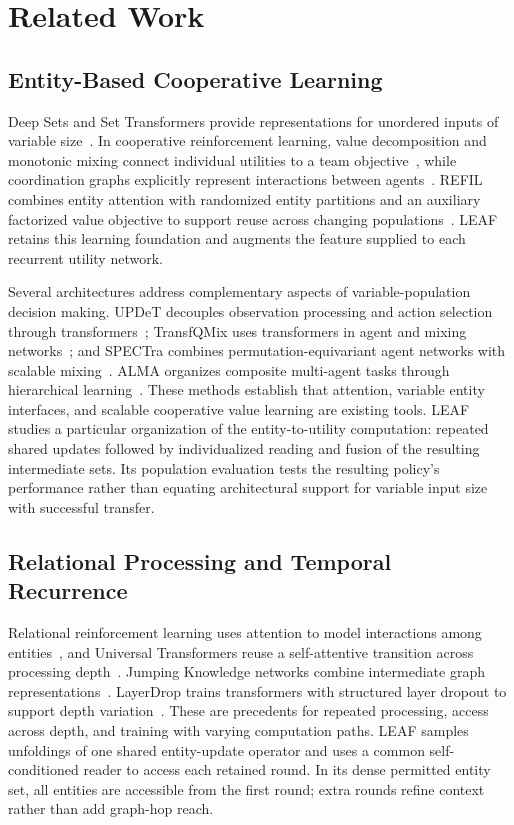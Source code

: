 \section{Related Work}
\subsection{Entity-Based Cooperative Learning}
Deep Sets and Set Transformers provide representations for unordered inputs of variable size~\cite{zaheer2017deepsets,lee2019settransformer}. In cooperative reinforcement learning, value decomposition and monotonic mixing connect individual utilities to a team objective~\cite{sunehag2018vdn,rashid2018qmix}, while coordination graphs explicitly represent interactions between agents~\cite{boehmer2020dcg}. REFIL combines entity attention with randomized entity partitions and an auxiliary factorized value objective to support reuse across changing populations~\cite{iqbal2021refil}. LEAF retains this learning foundation and augments the feature supplied to each recurrent utility network.

Several architectures address complementary aspects of variable-population decision making. UPDeT decouples observation processing and action selection through transformers~\cite{hu2021updet}; TransfQMix uses transformers in agent and mixing networks~\cite{transfqmix2023}; and SPECTra combines permutation-equivariant agent networks with scalable mixing~\cite{park2026spectra}. ALMA organizes composite multi-agent tasks through hierarchical learning~\cite{iqbal2022alma}. These methods establish that attention, variable entity interfaces, and scalable cooperative value learning are existing tools. LEAF studies a particular organization of the entity-to-utility computation: repeated shared updates followed by individualized reading and fusion of the resulting intermediate sets. Its population evaluation tests the resulting policy's performance rather than equating architectural support for variable input size with successful transfer.

\subsection{Relational Processing and Temporal Recurrence}
Relational reinforcement learning uses attention to model interactions among entities~\cite{zambaldi2019relational}, and Universal Transformers reuse a self-attentive transition across processing depth~\cite{dehghani2019universal}. Jumping Knowledge networks combine intermediate graph representations~\cite{xu2018jk}. LayerDrop trains transformers with structured layer dropout to support depth variation~\cite{fan2020layerdrop}. These are precedents for repeated processing, access across depth, and training with varying computation paths. LEAF samples unfoldings of one shared entity-update operator and uses a common self-conditioned reader to access each retained round. In its dense permitted entity set, all entities are accessible from the first round; extra rounds refine context rather than add graph-hop reach.

